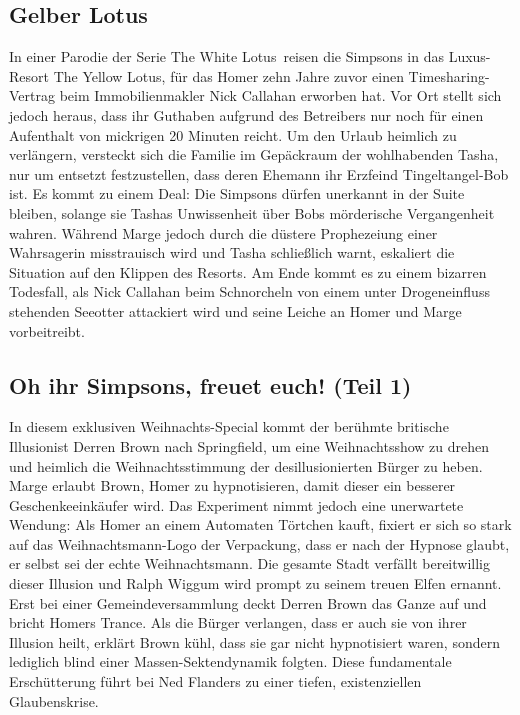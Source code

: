 \subsection{Gelber Lotus}
In einer Parodie der Serie \glqq The White Lotus\grqq\ reisen die Simpsons in das Luxus-Resort \glqq The Yellow Lotus\grqq, für das Homer zehn Jahre zuvor einen Timesharing-Vertrag beim Immobilienmakler Nick Callahan erworben hat. Vor Ort stellt sich jedoch heraus, dass ihr Guthaben aufgrund des Betreibers nur noch für einen Aufenthalt von mickrigen 20 Minuten reicht. Um den Urlaub heimlich zu verlängern, versteckt sich die Familie im Gepäckraum der wohlhabenden Tasha, nur um entsetzt festzustellen, dass deren Ehemann ihr Erzfeind Tingeltangel-Bob ist. Es kommt zu einem Deal: Die Simpsons dürfen unerkannt in der Suite bleiben, solange sie Tashas Unwissenheit über Bobs mörderische Vergangenheit wahren. Während Marge jedoch durch die düstere Prophezeiung einer Wahrsagerin misstrauisch wird und Tasha schließlich warnt, eskaliert die Situation auf den Klippen des Resorts. Am Ende kommt es zu einem bizarren Todesfall, als Nick Callahan beim Schnorcheln von einem unter Drogeneinfluss stehenden Seeotter attackiert wird und seine Leiche an Homer und Marge vorbeitreibt.

\subsection{Oh ihr Simpsons, freuet euch! (Teil 1)}
In diesem exklusiven Weihnachts-Special kommt der berühmte britische Illusionist Derren Brown nach Springfield, um eine Weihnachtsshow zu drehen und heimlich die Weihnachtsstimmung der desillusionierten Bürger zu heben. Marge erlaubt Brown, Homer zu hypnotisieren, damit dieser ein besserer Geschenkeeinkäufer wird. Das Experiment nimmt jedoch eine unerwartete Wendung: Als Homer an einem Automaten Törtchen kauft, fixiert er sich so stark auf das Weihnachtsmann-Logo der Verpackung, dass er nach der Hypnose glaubt, er selbst sei der echte Weihnachtsmann. Die gesamte Stadt verfällt bereitwillig dieser Illusion und Ralph Wiggum wird prompt zu seinem treuen Elfen ernannt. Erst bei einer Gemeindeversammlung deckt Derren Brown das Ganze auf und bricht Homers Trance. Als die Bürger verlangen, dass er auch sie von ihrer Illusion \glqq heilt\grqq, erklärt Brown kühl, dass sie gar nicht hypnotisiert waren, sondern lediglich blind einer Massen-Sektendynamik folgten. Diese fundamentale Erschütterung führt bei Ned Flanders zu einer tiefen, existenziellen Glaubenskrise.

